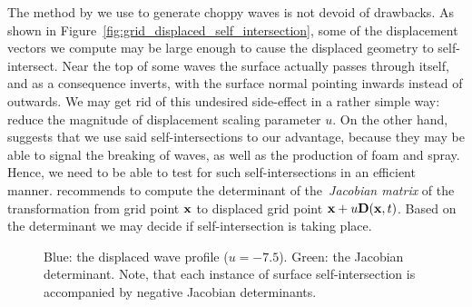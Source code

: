 %
The method by \citet{course:simulatingocean} we use to generate 
choppy waves is not devoid of drawbacks.
As shown in Figure~\ref{fig:grid_displaced_self_intersection}, some of the
displacement vectors we compute may be large enough to cause the displaced
geometry to self-intersect. Near the top of some 
waves the surface actually passes through itself, and as a consequence inverts, 
with the surface normal pointing inwards instead of outwards. We may get rid of 
this undesired side-effect in a rather simple way: reduce the magnitude of 
displacement scaling parameter $u$.
On the other hand, \citeauthor{course:simulatingocean} suggests that we use
said self-intersections to our advantage, because they may be able to signal
the breaking of waves, as well as the production of foam and spray. Hence, we
need to be able to test for such self-intersections in an efficient manner.
\citeauthor{course:simulatingocean} recommends to 
compute the determinant of the~\emph{Jacobian matrix} of the transformation 
from grid point $\mathbf{x}$ to displaced grid point 
$\mathbf{x}+u\mathbf{D}(\mathbf{x},t)$. Based on the determinant we may decide if 
self-intersection is taking place.
%
%
\begin{figure}
\centering
{}
\caption[Surface self-intersections and the Jacobian determinant.]{
Blue: the displaced wave profile ($u = -7.5$). Green: the Jacobian 
determinant. Note, that each instance of surface self-intersection is 
accompanied by negative Jacobian determinants.}
\label{fig:grid_displaced_j}
\end{figure}
